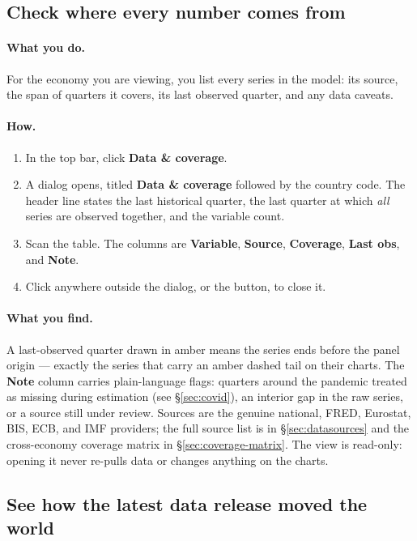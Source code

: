 \documentclass[11pt]{article}
\theoremstyle{definition}
\theoremstyle{remark}
\begin{document}
\subsection{Check where every number comes from}

\paragraph{What you do.}
For the economy you are viewing, you list every series in the model: its source,
the span of quarters it covers, its last observed quarter, and any data caveats.

\paragraph{How.}
\begin{enumerate}
  \item In the top bar, click \textbf{Data \& coverage}.
  \item A dialog opens, titled \textbf{Data \& coverage} followed by the country
    code. The header line states the last historical quarter, the last quarter at
    which \emph{all} series are observed together, and the variable count.
  \item Scan the table. The columns are \textbf{Variable}, \textbf{Source},
    \textbf{Coverage}, \textbf{Last obs}, and \textbf{Note}.
  \item Click anywhere outside the dialog, or the \textbf{\texttimes} button, to
    close it.
\end{enumerate}

\paragraph{What you find.}
A last-observed quarter drawn in amber means the series ends before the panel
origin --- exactly the series that carry an amber dashed tail on their charts. The
\textbf{Note} column carries plain-language flags: quarters around the pandemic
treated as missing during estimation (see \S\ref{sec:covid}), an interior gap in
the raw series, or a source still under review. Sources are the genuine national,
FRED, Eurostat, BIS, ECB, and IMF providers; the full source list is in
\S\ref{sec:datasources} and the cross-economy coverage matrix in
\S\ref{sec:coverage-matrix}. The view is read-only: opening it never re-pulls data
or changes anything on the charts.

\subsection{See how the latest data release moved the world}
\end{document}
